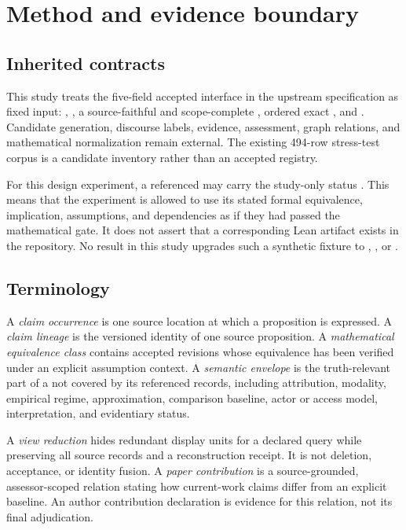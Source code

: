 \section{Method and evidence boundary}\label{sec:method}

\subsection{Inherited contracts}

This study treats the five-field accepted \ScientificClaim{} interface in the upstream specification as fixed input: , , a source-faithful and scope-complete , ordered exact , and . Candidate generation, discourse labels, evidence, assessment, graph relations, and mathematical normalization remain external. The existing 494-row stress-test corpus is a candidate inventory rather than an accepted registry.

For this design experiment, a referenced \MathClaim{} may carry the study-only status . This means that the experiment is allowed to use its stated formal equivalence, implication, assumptions, and dependencies as if they had passed the mathematical gate. It does not assert that a corresponding Lean artifact exists in the repository. No result in this study upgrades such a synthetic fixture to , , or .

\subsection{Terminology}

A \emph{claim occurrence} is one source location at which a proposition is expressed. A \emph{claim lineage} is the versioned identity of one source proposition. A \emph{mathematical equivalence class} contains accepted \MathClaim{} revisions whose equivalence has been verified under an explicit assumption context. A \emph{semantic envelope} is the truth-relevant part of a \ScientificClaim{} not covered by its referenced \MathClaim{} records, including attribution, modality, empirical regime, approximation, comparison baseline, actor or access model, interpretation, and evidentiary status.

A \emph{view reduction} hides redundant display units for a declared query while preserving all source records and a reconstruction receipt. It is not deletion, acceptance, or identity fusion. A \emph{paper contribution} is a source-grounded, assessor-scoped relation stating how current-work claims differ from an explicit baseline. An author contribution declaration is evidence for this relation, not its final adjudication.

